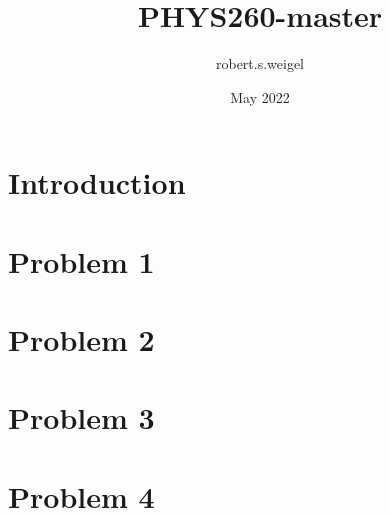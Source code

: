 \documentclass{article}
\title{PHYS260-master}
\author{robert.s.weigel }
\date{May 2022}
\begin{document}
\maketitle

\section{Introduction}
\section{Problem 1}
\section{Problem 2}
\section{Problem 3}
\section{Problem 4}
\end{document}
